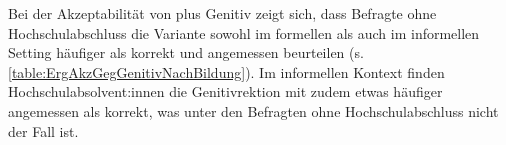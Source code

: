 Bei der Akzeptabilität von \gegenueber{} plus Genitiv zeigt sich, dass Befragte ohne Hochschulabschluss die Variante sowohl im formellen als auch im informellen Setting häufiger als korrekt und angemessen beurteilen (s. \autoref{table:ErgAkzGegGenitivNachBildung}). 
Im informellen Kontext finden Hochschulabsolvent:innen die Genitivrektion mit \gegenueber{} zudem etwas häufiger angemessen als korrekt, was unter den Befragten ohne Hochschulabschluss nicht der Fall ist. 

\begin{table}
\centering
{}
\end{table}
